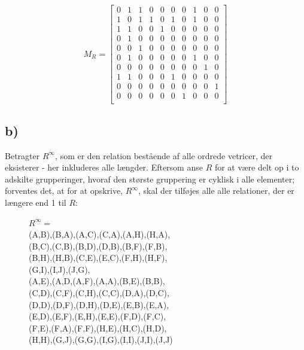 \documentclass[a4paper,10pt]{article}
\begin{document}
\begin{equation}
M_{R} = \begin{bmatrix}
        0 & 1 & 1 & 0 & 0 & 0 & 0 & 1 & 0 & 0 \\[0.3em]
        1 & 0 & 1 & 1 & 0 & 1 & 0 & 1 & 0 & 0 \\[0.3em]
        1 & 1 & 0 & 0 & 1 & 0 & 0 & 0 & 0 & 0 \\[0.3em]
        0 & 1 & 0 & 0 & 0 & 0 & 0 & 0 & 0 & 0 \\[0.3em]
        0 & 0 & 1 & 0 & 0 & 0 & 0 & 0 & 0 & 0 \\[0.3em]
        0 & 1 & 0 & 0 & 0 & 0 & 0 & 1 & 0 & 0 \\[0.3em]
        0 & 0 & 0 & 0 & 0 & 0 & 0 & 0 & 1 & 0 \\[0.3em]
        1 & 1 & 0 & 0 & 0 & 1 & 0 & 0 & 0 & 0 \\[0.3em]
        0 & 0 & 0 & 0 & 0 & 0 & 0 & 0 & 0 & 1 \\[0.3em]
        0 & 0 & 0 & 0 & 0 & 0 & 1 & 0 & 0 & 0 \\[0.3em]
\end{bmatrix}
\end{equation}

\subsection{b)}
Betragter $R^{\infty}$, som er den relation bestående af alle ordrede vetricer, der eksisterer - her inkluderes alle længder. Eftersom anse $R$ for at være delt op i to adskilte grupperinger, hvoraf den største gruppering er cyklisk i alle elementer; forventes det, at for at opskrive, $R^{\infty}$, skal der tilføjes alle alle relationer, der er længere end 1 til $R$:

\begin{figure}[H]
\centering
$R^{\infty} =$ \\
{(A,B),(B,A),(A,C),(C,A),(A,H),(H,A),\\
(B,C),(C,B),(B,D),(D,B),(B,F),(F,B),\\ 
(B,H),(H,B),(C,E),(E,C),(F,H),(H,F), \\
(G,I),(I,J),(J,G), \\
(A,E),(A,D,(A,F),(A,A),(B,E),(B,B),\\
(C,D),(C,F),(C,H),(C,C),(D,A),(D,C),\\
(D,D),(D,F),(D,H),(D,E),(E,B),(E,A),\\
(E,D),(E,F),(E,H),(E,E),(F,D),(F,C),\\
(F,E),(F,A),(F,F),(H,E),(H,C),(H,D),\\
(H,H),(G,J),(G,G),(I,G),(I,I),(J,I),(J,J)}
\end{figure}
\end{document}
